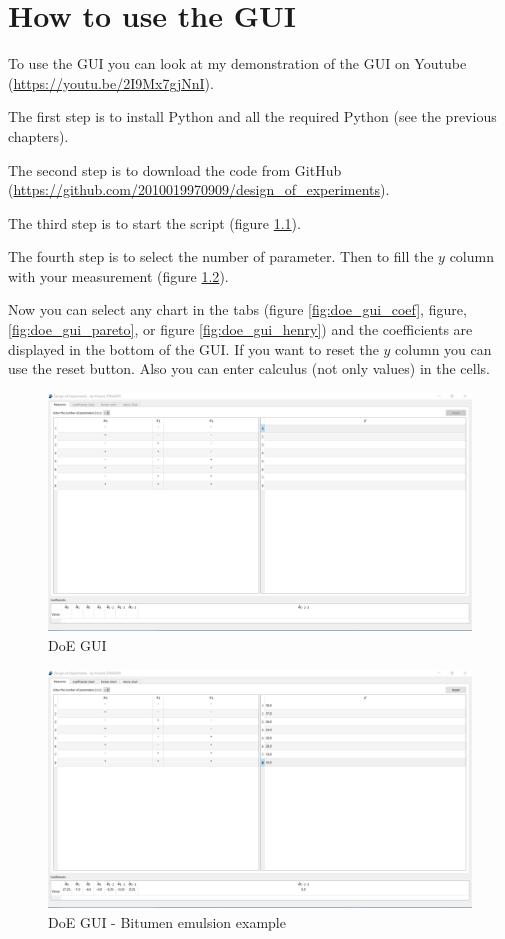 \documentclass[english, 12 pt, openany, oneside]{book}
\begin{document}
\chapter{How to use the GUI}
To use the GUI you can look at my demonstration of the GUI on Youtube (\url{https://youtu.be/2I9Mx7gjNnI}).

The first step is to install Python and all the required Python (see the previous chapters).

The second step is to download the code from GitHub (\url{https://github.com/2010019970909/design_of_experiments}).

The third step is to start the  script (figure \ref{fig:doe_gui}).

The fourth step is to select the number of parameter. Then to fill the $y$ column with your measurement (figure \ref{fig:doe_gui_filled}).

Now you can select any chart in the tabs (figure \ref{fig:doe_gui_coef}, figure, \ref{fig:doe_gui_pareto}, or figure \ref{fig:doe_gui_henry}) and the coefficients are displayed in the bottom of the GUI. If you want to reset the $y$ column you can use the reset button. Also you can enter calculus (not only values) in the cells.

\begin{figure}[!ht]
\centering
\includegraphics[width=\linewidth]{doe_gui}
\caption{DoE GUI\label{fig:doe_gui}}
\end{figure}

\begin{figure}[!ht]
\centering
\includegraphics[width=\linewidth]{doe_gui_filled}
\caption{DoE GUI - Bitumen emulsion example\label{fig:doe_gui_filled}}
\end{figure}
\end{document}
